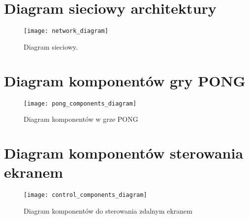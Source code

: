 \begin{appendices}

\newpage
\section{Diagram sieciowy architektury}
\label{app:network_diagram_app}
\begin{figure}[H]
\begin{center}
    \texttt{[image: network\_diagram]}
\end{center}
\caption{Diagram sieciowy.}
\label{fig:network_diagram1}
\end{figure}



\newpage
\section{Diagram komponentów gry PONG}
\label{app:netwo}
\begin{figure}[H]
\begin{center}
    \texttt{[image: pong\_components\_diagram]}
\end{center}
\caption{Diagram komponentów w grze PONG}
\label{fig:network_diagram}
\end{figure}



\newpage
\section{Diagram komponentów sterowania ekranem}
\label{app:netwo}
\begin{figure}[H]
\begin{center}
    \texttt{[image: control\_components\_diagram]}
\end{center}
\caption{Diagram komponentów do sterowania zdalnym ekranem}
\label{fig:network_diagram}
\end{figure}




\newpage

\end{appendices}
